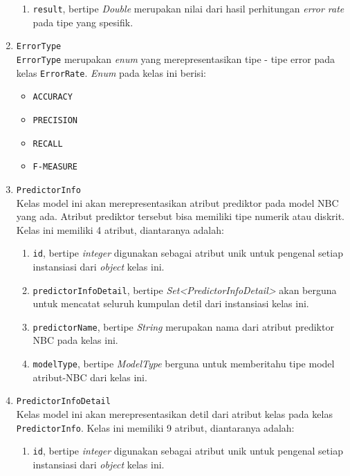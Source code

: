 \begin{enumerate}
\begin{enumerate}
		\item \texttt{result}, bertipe \textit{Double} merupakan nilai dari hasil perhitungan \textit{error rate} pada tipe yang spesifik.
		
		
	\end{enumerate}

	\item \texttt{ErrorType}\\
	\texttt{ErrorType} merupakan \textit{enum} yang merepresentasikan tipe - tipe error pada kelas \texttt{ErrorRate}. \textit{Enum} pada kelas ini berisi:
	\begin{itemize}
		\item \texttt{ACCURACY}
		\item \texttt{PRECISION}
		\item \texttt{RECALL}
		\item \texttt{F-MEASURE}
	\end{itemize}	 

	\item \texttt{PredictorInfo}\\
	Kelas model ini akan merepresentasikan atribut prediktor pada model NBC yang ada. Atribut prediktor tersebut bisa memiliki tipe numerik atau diskrit. Kelas ini memiliki 4 atribut, diantaranya adalah:
	\begin{enumerate}
		\item \texttt{id}, bertipe \textit{integer} digunakan sebagai atribut unik untuk pengenal setiap instansiasi dari \textit{object} kelas ini.
		
		\item \texttt{predictorInfoDetail}, bertipe \textit{Set<PredictorInfoDetail>} akan berguna untuk mencatat seluruh kumpulan detil dari instansiasi kelas ini.

		\item \texttt{predictorName}, bertipe \textit{String} merupakan nama dari atribut prediktor NBC pada kelas ini.
		
		\item \texttt{modelType}, bertipe \textit{ModelType} berguna untuk memberitahu tipe model atribut-NBC dari kelas ini.
		
				
	\end{enumerate}

	\item \texttt{PredictorInfoDetail}\\
	Kelas model ini akan merepresentasikan detil dari atribut kelas pada kelas \texttt{PredictorInfo}. Kelas ini memiliki 9 atribut, diantaranya adalah:
	\begin{enumerate}
		\item \texttt{id}, bertipe \textit{integer} digunakan sebagai atribut unik untuk pengenal setiap instansiasi dari \textit{object} kelas ini.
		

\end{enumerate}
\end{enumerate}
